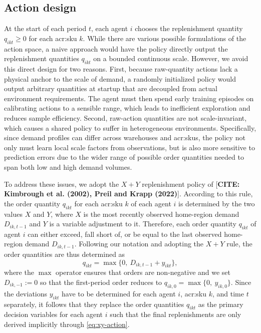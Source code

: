 \subsection{Action design}
\label{subsec:action-design}
At the start of each period $t$, each agent $i$ chooses the replenishment quantity $q_{ikt} \ge 0$ for each \gls{acr:sku} $k$. While there are various possible formulations of the action space, a naive approach would have the policy directly output the replenishment quantities $q_{ikt}$ on a bounded continuous scale. However, we avoid this direct design for two reasons. First, because raw-quantity actions lack a physical anchor to the scale of demand, a randomly initialized policy would output arbitrary quantities at startup that are decoupled from actual environment requirements. The agent must then spend early training episodes on calibrating actions to a sensible range, which leads to inefficient exploration and reduces sample efficiency. Second, raw-action quantities are not scale-invariant, which causes a shared policy to suffer in heterogeneous environments. Specifically, since demand profiles can differ across warehouses and \glspl{acr:sku}, the policy not only must learn local scale factors from observations, but is also more sensitive to prediction errors due to the wider range of possible order quantities needed to span both low and high demand volumes. 

To address these issues, we adopt the $X+Y$ replenishment policy of [\textbf{CITE: Kimbrough et al. (2002), Preil and Krapp (2022)}]. According to this rule, the order quantity $q_{ikt}$ for each \gls{acr:sku} $k$ of each agent $i$ is determined by the two values $X$ and $Y$, where $X$ is the most recently observed home-region demand $D_{ik,t-1}$ and $Y$ is a variable adjustment to it. Therefore, each order quantity $q_{ikt}$ of agent $i$ can either exceed, fall short of, or be equal to the last observed home-region demand $D_{ik,t-1}$. Following our notation and adopting the $X+Y$ rule, the order quantities are thus determined as 
\begin{equation}
\label{eq:xy-action}
  q_{ikt} = \max\!\big\{0,\ D_{ik,t-1} + y_{ikt}\big\},
\end{equation}
where the $\operatorname{max}$ operator ensures that orders are non-negative and we set $D_{ik,-1} := 0$ so that the first-period order reduces to $q_{ik,0} = \max\{0,\ y_{ik,0}\}$. Since the deviations $y_{ikt}$ have to be determined for each agent $i$, \gls{acr:sku} $k$, and time $t$ separately, it follows that they replace the order quantities $q_{ikt}$ as the primary decision variables for each agent $i$ such that the final replenishments are only derived implicitly through \autoref{eq:xy-action}.

